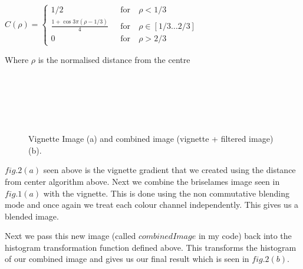 \documentclass[]{assignment}
\begin{document}
$C(\rho) = 
\left\{ \begin{array}{lcl}
1/2  & ~~~\mbox{for}~ &\rho < 1/3\\
\displaystyle \frac{1+\cos 3 \pi (\rho-1/3)}{4}  & ~~~\mbox{for}~ &\rho\in [1/3\ldots 2/3]\\
0  & ~~~\mbox{for}~ &\rho> 2/3
\end{array}
\right.$


Where $\rho$ is the normalised distance from the centre

\clearpage

\begin{figure}[h]
\centering
\fboxsep 0mm
\parbox{5cm}{\\}
~~~
\parbox{5cm}{\\}
\caption{\label{fig:imgfilter2} Vignette Image (a) and combined image (vignette + filtered image) (b).}
\end{figure} 

$fig.2(a)$ seen above is the vignette gradient that we created using the distance from center algorithm above. Next we combine the briselames image seen in $fig.1(a)$ with the vignette. This is done using the non commutative blending mode and once again we treat each colour channel independently. This gives us a blended image. 

Next we pass this new image (called $combinedImage$ in my code) back into the histogram transformation function defined above. This transforms the histogram of our combined image and gives us our final result which is seen in $fig.2(b)$.  
\end{document}

